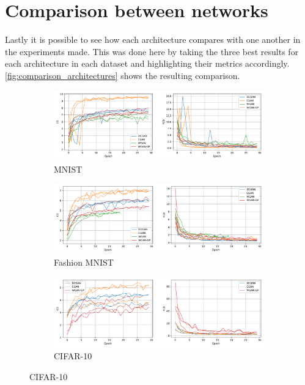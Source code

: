 \section{Comparison between networks}
Lastly it is possible to see how each architecture compares with one another in the experiments made. This was done here by taking the three best results for each architecture in each dataset and highlighting their metrics accordingly. \autoref{fig:comparison_architectures} shows the resulting comparison.
\begin{figure}[hbt]
    \caption{Comparison of different GAN architectures performances}
    \centering
        \begin{subfigure}[b]{\textwidth}
        \centering
        \includegraphics[width=\textwidth]{chapters/Experiments/Comparison/Comparison_MNIST.pdf}
        \caption{MNIST}
        \end{subfigure}
        
        \begin{subfigure}[b]{\textwidth}
        \centering
        \includegraphics[width=\textwidth]{chapters/Experiments/Comparison/Comparison_Fashion.pdf}
        \caption{Fashion MNIST}
        \end{subfigure}
        
        \begin{subfigure}[b]{\textwidth}
        \centering
        \includegraphics[width=\textwidth]{chapters/Experiments/Comparison/Comparison_CIFAR.pdf}
        \caption{CIFAR-10}
        \end{subfigure}
    \label{fig:comparison_architectures}
\end{figure}

